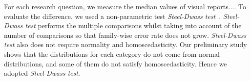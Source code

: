 For each research question, we measure the median values of visual reports.... 
To evaluate the difference, we used a non-parametric test \textit{Steel-Dwass test}~\citep{steel-dwass-test}.
\textit{Steel-Dwass test} performs the multiple comparisons whilst taking into account of the number of comparisons so that family-wise error rate does not grow.
\textit{Steel-Dwass test} also does not require normality and homoscedasticity.
Our preliminary study shows that the distributions for each category do not come from normal distributions, and some of them do not satisfy homoscedasticity. 
Hence we adopted \textit{Steel-Dwass test}.
